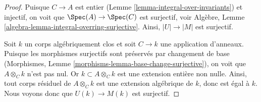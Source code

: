 \begin{proof}
Puisque $C \to A$ est entier (Lemme \ref{lemma-integral-over-invariants})
et injectif, on voit que $\Spec(A) \to \Spec(C)$ est surjectif, voir
Algèbre, Lemme \ref{algebra-lemma-integral-overring-surjective}.
Ainsi, $|U| \to |M|$ est surjectif.

\medskip\noindent
Soit $k$ un corps algébriquement clos et soit $C \to k$ une application d'anneaux.
Puisque les morphismes surjectifs sont préservés par changement de base
(Morphismes, Lemme \ref{morphisms-lemma-base-change-surjective}),
on voit que $A \otimes_C k$ n'est pas nul. Or $k \subset A \otimes_C k$ est une
extension entière non nulle. Ainsi, tout corps résiduel de $A \otimes_C k$
est une extension algébrique de $k$, donc est égal à $k$. Nous voyons donc que
$U(k) \to M(k)$ est surjectif.


\end{proof}
